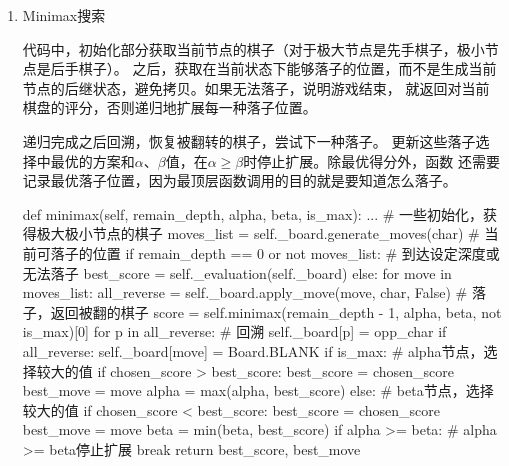 \documentclass[10pt,letterpaper]{ctexart}
\begin{document}
\begin{enumerate}[itemindent=2.5em,label=\arabic*、]
  \item Minimax搜索
  \par \qquad 代码中，初始化部分获取当前节点的棋子（对于极大节点是先手棋子，极小节点是后手棋子）。
  之后，获取在当前状态下能够落子的位置，而不是生成当前节点的后继状态，避免拷贝。如果无法落子，说明游戏结束，
  就返回对当前棋盘的评分，否则递归地扩展每一种落子位置。
  \par \qquad 递归完成之后回溯，恢复被翻转的棋子，尝试下一种落子。
  更新这些落子选择中最优的方案和$\alpha$、$\beta$值，在$\alpha \geq \beta$时停止扩展。除最优得分外，函数
  还需要记录最优落子位置，因为最顶层函数调用的目的就是要知道怎么落子。
  \newpage
  \begin{python}
def minimax(self, remain_depth, alpha, beta, is_max):
  ... # 一些初始化，获得极大极小节点的棋子
  moves_list = self._board.generate_moves(char)   # 当前可落子的位置
  if remain_depth == 0 or not moves_list:   # 到达设定深度或无法落子
      best_score = self._evaluation(self._board)
  else:
    for move in moves_list:
      all_reverse = self._board.apply_move(move, char, False)   # 落子，返回被翻的棋子
      score = self.minimax(remain_depth - 1, alpha, beta, not is_max)[0]
      for p in all_reverse:   # 回溯
          self._board[p] = opp_char
      if all_reverse:
          self._board[move] = Board.BLANK
      if is_max:    # alpha节点，选择较大的值
          if chosen_score > best_score:
              best_score = chosen_score
              best_move = move
          alpha = max(alpha, best_score)
      else:         # beta节点，选择较大的值
          if chosen_score < best_score:
              best_score = chosen_score
              best_move = move
          beta = min(beta, best_score)
      if alpha >= beta:   # alpha >= beta停止扩展
          break
    return best_score, best_move
\end{python}
  

\end{enumerate}
\end{document}
